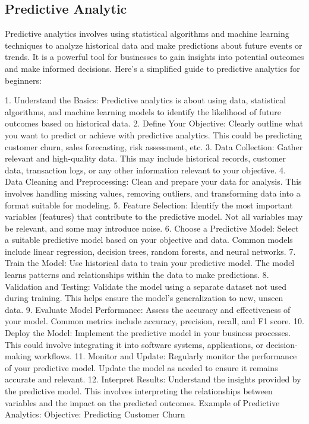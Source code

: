 % 
\subsection{Predictive Analytic}
\label{relatedknowledge:Demand Prediction:Predictive Analytic}
%

Predictive analytics involves using statistical algorithms and machine learning techniques to analyze historical data and make predictions about future events or trends. It is a powerful tool for businesses to gain insights into potential outcomes and make informed decisions. Here's a simplified guide to predictive analytics for beginners:

1. Understand the Basics:
Predictive analytics is about using data, statistical algorithms, and machine learning models to identify the likelihood of future outcomes based on historical data.
2. Define Your Objective:
Clearly outline what you want to predict or achieve with predictive analytics. This could be predicting customer churn, sales forecasting, risk assessment, etc.
3. Data Collection:
Gather relevant and high-quality data. This may include historical records, customer data, transaction logs, or any other information relevant to your objective.
4. Data Cleaning and Preprocessing:
Clean and prepare your data for analysis. This involves handling missing values, removing outliers, and transforming data into a format suitable for modeling.
5. Feature Selection:
Identify the most important variables (features) that contribute to the predictive model. Not all variables may be relevant, and some may introduce noise.
6. Choose a Predictive Model:
Select a suitable predictive model based on your objective and data. Common models include linear regression, decision trees, random forests, and neural networks.
7. Train the Model:
Use historical data to train your predictive model. The model learns patterns and relationships within the data to make predictions.
8. Validation and Testing:
Validate the model using a separate dataset not used during training. This helps ensure the model's generalization to new, unseen data.
9. Evaluate Model Performance:
Assess the accuracy and effectiveness of your model. Common metrics include accuracy, precision, recall, and F1 score.
10. Deploy the Model:
Implement the predictive model in your business processes. This could involve integrating it into software systems, applications, or decision-making workflows.
11. Monitor and Update:
Regularly monitor the performance of your predictive model. Update the model as needed to ensure it remains accurate and relevant.
12. Interpret Results:
Understand the insights provided by the predictive model. This involves interpreting the relationships between variables and the impact on the predicted outcomes.
Example of Predictive Analytics:
Objective: Predicting Customer Churn

